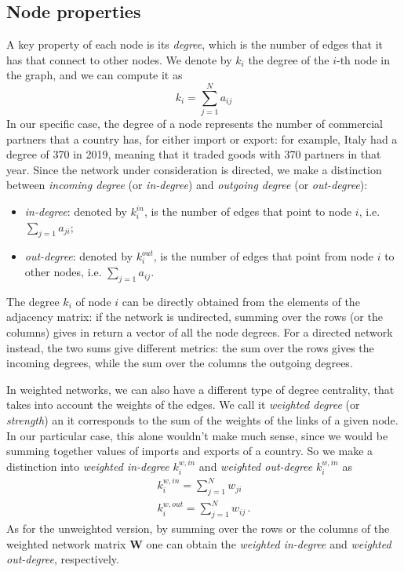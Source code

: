 \subsection{Node properties}
A key property of each node is its \textit{degree}, which is the number of edges that it has that connect to other nodes. We denote by $k_i$ the degree of the $i$-th node in the graph, and we can compute it as 
\[
    k_i = \sum_{j=1}^N a_{ij}
\] 
In our specific case, the degree of a node represents the number of commercial partners that a country has, for either import or export: for example, Italy had a degree of 370 in 2019, meaning that it traded goods with 370 partners in that year.
Since the network under consideration is directed, we make a distinction between \textit{incoming degree} (or \textit{in-degree}) and \textit{outgoing degree} (or \textit{out-degree}):
\begin{itemize}
    \item \textit{in-degree}: denoted by $k_i^{in}$, is the number of edges that point to node $i$, i.e. $\sum_{j=1} a_{ji}$;
    \item \textit{out-degree}: denoted by $k_i^{out}$, is the number of edges that point from node $i$ to other nodes, i.e. $\sum_{j=1} a_{ij}$.
\end{itemize}
The degree $k_i$ of node $i$ can be directly obtained from the elements of the adjacency matrix: if the network is undirected, summing over the rows (or the columns) gives in return a vector of all the node degrees. For a directed network instead, the two sums give different metrics: the sum over the rows gives the incoming degrees, while the sum over the columns the outgoing degrees.

In weighted networks, we can also have a different type of degree centrality, that takes into account the weights of the edges. We call it \textit{weighted degree} (or \textit{strength}) an it corresponds to the sum of the weights of the links of a given node. In our particular case, this alone wouldn't make much sense, since we would be summing together values of imports and exports of a country. So we make a distinction into \textit{weighted in-degree} $k_i^{w,in}$ and \textit{weighted out-degree} $k_i^{w,in}$ as
\begin{align*}
    k_i^{w,in} = \sum_{j=1}^N w_{ji} \\    
    k_i^{w,out} = \sum_{j=1}^N w_{ij} \,.    
\end{align*}
As for the unweighted version, by summing over the rows or the columns of the weighted network matrix $\mathbf{W}$ one can obtain the \textit{weighted in-degree} and \textit{weighted out-degree}, respectively.

